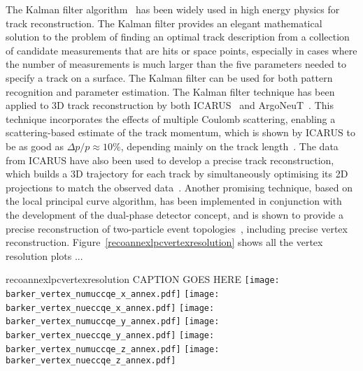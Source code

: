 The Kalman filter algorithm~\cite{kalman} has been widely used in high
energy physics for track reconstruction. The Kalman filter provides an
elegant mathematical solution to the problem of finding an optimal
track description from a collection of candidate measurements that are
hits or space points, especially in cases where the number of
measurements is much larger than the five parameters needed to specify
a track on a surface.  The Kalman filter can be used for both pattern
recognition and parameter estimation.
The Kalman filter technique has been applied
to 3D track reconstruction by both ICARUS~\cite{Ankowski:2006ts} and ArgoNeuT~\cite{REF}.
This technique incorporates the effects of multiple Coulomb scattering,
enabling a scattering-based estimate of the track momentum,
which is shown by ICARUS to be as good as $\Delta p/p \approx 10\%$, 
depending mainly on the track length~\cite{Ankowski:2006ts}.
The data from ICARUS have also been used to develop a precise
track reconstruction, which builds a 3D trajectory for each track by simultaneously
optimising its 2D projections to match the observed data~\cite{Antonello:2012hu}.
Another promising technique, based on the local principal curve algorithm, 
has been implemented in conjunction with the development of the 
dual-phase detector concept, and is shown to provide 
a precise reconstruction of two-particle event topologies~\cite{Back:2013cva,LAGUNA-LBNO-deliv},
including precise vertex reconstruction.
Figure~\ref{recoannexlpcvertexresolution} shows all the vertex resolution plots ...

\begin{cdrfigure}{recoannexlpcvertexresolution}
{CAPTION GOES HERE}
\texttt{[image: barker\_vertex\_numuccqe\_x\_annex.pdf]}
\texttt{[image: barker\_vertex\_nueccqe\_x\_annex.pdf]}
\texttt{[image: barker\_vertex\_numuccqe\_y\_annex.pdf]}
\texttt{[image: barker\_vertex\_nueccqe\_y\_annex.pdf]}
\texttt{[image: barker\_vertex\_numuccqe\_z\_annex.pdf]}
\texttt{[image: barker\_vertex\_nueccqe\_z\_annex.pdf]}
\end{cdrfigure}



